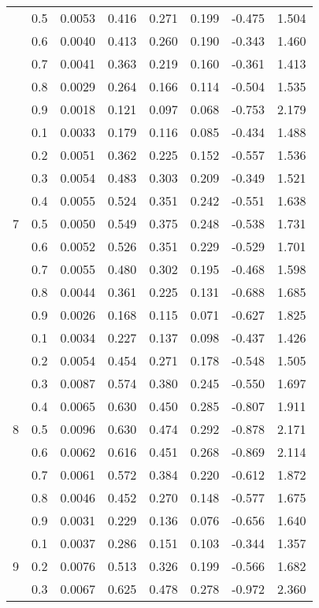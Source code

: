 \documentclass[11pt,a4paper]{report}
\begin{document}
\begin{longtable}{ | c | c || c | c | c | c | c | c | }
 & 0.5 & 0.0053 & 0.416 & 0.271 & 0.199 & -0.475 & 1.504 \\
 & 0.6 & 0.0040 & 0.413 & 0.260 & 0.190 & -0.343 & 1.460 \\
 & 0.7 & 0.0041 & 0.363 & 0.219 & 0.160 & -0.361 & 1.413 \\
 & 0.8 & 0.0029 & 0.264 & 0.166 & 0.114 & -0.504 & 1.535 \\
 & 0.9 & 0.0018 & 0.121 & 0.097 & 0.068 & -0.753 & 2.179 \\
 \hline
\multirow{9}{*}{7} & 0.1 & 0.0033 & 0.179 & 0.116 & 0.085 & -0.434 & 1.488 \\
 & 0.2 & 0.0051 & 0.362 & 0.225 & 0.152 & -0.557 & 1.536 \\
 & 0.3 & 0.0054 & 0.483 & 0.303 & 0.209 & -0.349 & 1.521 \\
 & 0.4 & 0.0055 & 0.524 & 0.351 & 0.242 & -0.551 & 1.638 \\
 & 0.5 & 0.0050 & 0.549 & 0.375 & 0.248 & -0.538 & 1.731 \\
 & 0.6 & 0.0052 & 0.526 & 0.351 & 0.229 & -0.529 & 1.701 \\
 & 0.7 & 0.0055 & 0.480 & 0.302 & 0.195 & -0.468 & 1.598 \\
 & 0.8 & 0.0044 & 0.361 & 0.225 & 0.131 & -0.688 & 1.685 \\
 & 0.9 & 0.0026 & 0.168 & 0.115 & 0.071 & -0.627 & 1.825 \\
 \hline
\multirow{9}{*}{8} & 0.1 & 0.0034 & 0.227 & 0.137 & 0.098 & -0.437 & 1.426 \\
 & 0.2 & 0.0054 & 0.454 & 0.271 & 0.178 & -0.548 & 1.505 \\
 & 0.3 & 0.0087 & 0.574 & 0.380 & 0.245 & -0.550 & 1.697 \\
 & 0.4 & 0.0065 & 0.630 & 0.450 & 0.285 & -0.807 & 1.911 \\
 & 0.5 & 0.0096 & 0.630 & 0.474 & 0.292 & -0.878 & 2.171 \\
 & 0.6 & 0.0062 & 0.616 & 0.451 & 0.268 & -0.869 & 2.114 \\
 & 0.7 & 0.0061 & 0.572 & 0.384 & 0.220 & -0.612 & 1.872 \\
 & 0.8 & 0.0046 & 0.452 & 0.270 & 0.148 & -0.577 & 1.675 \\
 & 0.9 & 0.0031 & 0.229 & 0.136 & 0.076 & -0.656 & 1.640 \\
 \hline
\multirow{9}{*}{9} & 0.1 & 0.0037 & 0.286 & 0.151 & 0.103 & -0.344 & 1.357 \\
 & 0.2 & 0.0076 & 0.513 & 0.326 & 0.199 & -0.566 & 1.682 \\
 & 0.3 & 0.0067 & 0.625 & 0.478 & 0.278 & -0.972 & 2.360 \\

\end{longtable}
\end{document}
